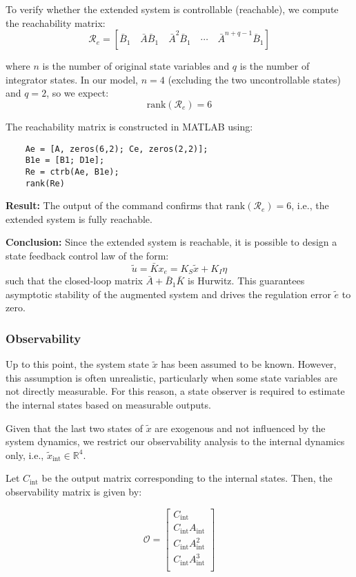\documentclass[]{report}
\begin{document}
To verify whether the extended system is controllable (reachable), we compute the reachability matrix:
\[
\mathcal{R}_e = \left[\bar{B}_1 \quad \bar{A}\bar{B}_1 \quad \bar{A}^2\bar{B}_1 \quad \cdots \quad \bar{A}^{n+q-1} \bar{B}_1 \right]
\]

where $n$ is the number of original state variables and $q$ is the number of integrator states. In our model, $n=4$ (excluding the two uncontrollable states) and $q=2$, so we expect:
\[
\text{rank}(\mathcal{R}_e) = 6
\]

The reachability matrix is constructed in MATLAB using:

\begin{verbatim}
	Ae = [A, zeros(6,2); Ce, zeros(2,2)];
	B1e = [B1; D1e];
	Re = ctrb(Ae, B1e);
	rank(Re)
\end{verbatim}

\textbf{Result:}  
The output of the command confirms that $\text{rank}(\mathcal{R}_e) = 6$, i.e., the extended system is fully reachable.

\textbf{Conclusion:}  
Since the extended system is reachable, it is possible to design a state feedback control law of the form:
\[
\tilde{u} = \bar{K} x_e = K_S \tilde{x} + K_I \eta
\]
such that the closed-loop matrix $\bar{A} + \bar{B}_1 \bar{K}$ is Hurwitz. This guarantees asymptotic stability of the augmented system and drives the regulation error $\tilde{e}$ to zero.



\subsubsection{Observability}

Up to this point, the system state $\tilde{x}$ has been assumed to be known. However, this assumption is often unrealistic, particularly when some state variables are not directly measurable. For this reason, a state observer is required to estimate the internal states based on measurable outputs.

Given that the last two states of $\tilde{x}$ are exogenous and not influenced by the system dynamics, we restrict our observability analysis to the internal dynamics only, i.e., $\tilde{x}_{\text{int}} \in \mathbb{R}^4$.

Let $C_{\text{int}}$ be the output matrix corresponding to the internal states. Then, the observability matrix is given by:

\[
\mathcal{O} = \begin{bmatrix}
	C_{\text{int}} \\
	C_{\text{int}} A_{\text{int}} \\
	C_{\text{int}} A_{\text{int}}^2 \\
	C_{\text{int}} A_{\text{int}}^3 \\
\end{bmatrix}
\]
\end{document}
